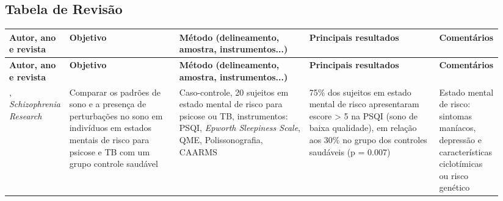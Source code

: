 \documentclass[chapter=TITLE,
               oneside,
               12pt,
               a4paper,
               english,
               brazil]{abntex2}    %
\begin{document}
\begin{apendicesenv}

    \begin{landscape}

    \chapter{Tabela de Revisão}
    \label{sec:tabelarevisao}
    
            \noindent
            \begin{longtabu} to 
            \toprule
            \textbf{Autor, ano e revista} & \textbf{Objetivo} &
            \textbf{Método (delineamento, amostra, instrumentos...)} &
            \textbf{Principais resultados} & \textbf{Comentários} \\ \midrule
            \endfirsthead
            \toprule
            \textbf{Autor, ano e revista} & \textbf{Objetivo} &
            \textbf{Método (delineamento, amostra, instrumentos...)} &
            \textbf{Principais resultados} & \textbf{Comentários} \\ \midrule
            \endhead

    \textcite{zanini_abnormalities_2015}, \textit{Schizophrenia Research} &
    Comparar os padrões de sono e a presença de perturbações no sono em
    indivíduos em estados mentais de risco para psicose e TB com um grupo
    controle saudável &
    Caso-controle, 20 sujeitos em estado mental de risco para psicose ou TB,
    instrumentos: PSQI, \textit{Epworth Sleepiness Scale}, QME,
    Polissonografia, CAARMS &
    75\% dos sujeitos em estado mental de risco apresentaram escore > 5 na
    PSQI (sono de baixa qualidade), em relação aos 30\% no grupo dos controles
    saudáveis (p = 0.007) &
    Estado mental de risco: sintomas maníacos, depressão e características
    ciclotímicas ou risco genético 
    \\ \midrule


\end{longtabu}
\end{landscape}
\end{apendicesenv}
\end{document}
